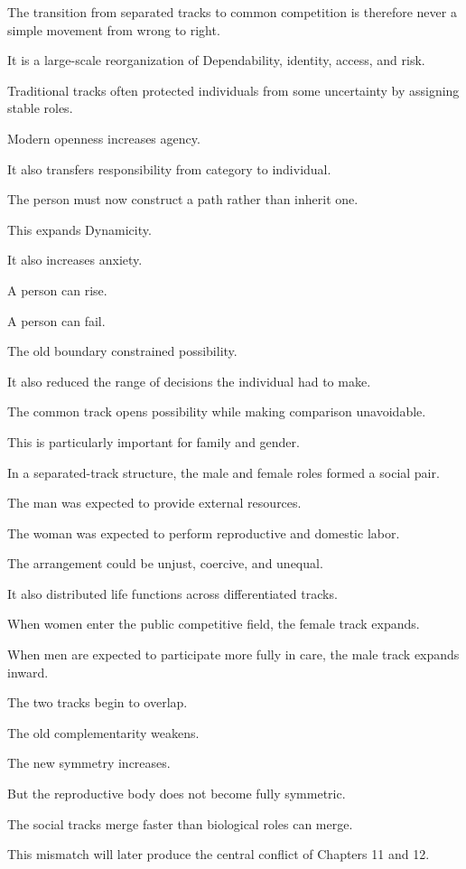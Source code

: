 The transition from separated tracks to common competition is therefore never a simple movement from wrong to right.

It is a large-scale reorganization of Dependability, identity, access, and risk.

Traditional tracks often protected individuals from some uncertainty by assigning stable roles.

Modern openness increases agency.

It also transfers responsibility from category to individual.

The person must now construct a path rather than inherit one.

This expands Dynamicity.

It also increases anxiety.

A person can rise.

A person can fail.

The old boundary constrained possibility.

It also reduced the range of decisions the individual had to make.

The common track opens possibility while making comparison unavoidable.

This is particularly important for family and gender.

In a separated-track structure, the male and female roles formed a social pair.

The man was expected to provide external resources.

The woman was expected to perform reproductive and domestic labor.

The arrangement could be unjust, coercive, and unequal.

It also distributed life functions across differentiated tracks.

When women enter the public competitive field, the female track expands.

When men are expected to participate more fully in care, the male track expands inward.

The two tracks begin to overlap.

The old complementarity weakens.

The new symmetry increases.

But the reproductive body does not become fully symmetric.

The social tracks merge faster than biological roles can merge.

This mismatch will later produce the central conflict of Chapters 11 and 12.

